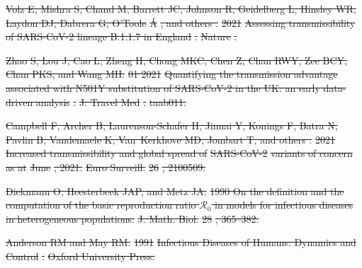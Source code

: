 \documentclass[12pt]{article}
\providecommand{\DIFdeltex}[1]{{\protect\color{red}\sout{#1}}}                      %
\providecommand{\DIFdel}[1]{\texorpdfstring{\DIFdeltex{#1}}{}} %
\begin{document}
\DIFdel{Volz E, Mishra S, Chand M, Barrett JC, Johnson R, Geidelberg L, Hinsley WR,
  Laydon DJ, Dabrera G, O'Toole }%
\DIFdel{\'A}%
\DIFdel{, and others .
}%
\DIFdel{2021 }%
\DIFdel{Assessing transmissibility of SARS-CoV-2 lineage B.1.1.7 in
  England}%
\DIFdel{.
}%
\DIFdel{Nature}%
\DIFdel{.
}%

\DIFdel{Zhao S, Lou J, Cao L, Zheng H, Chong MKC, Chen Z, Chan RWY, Zee BCY, Chan PKS,
  and Wang MH.
}%
\DIFdel{01 2021 }%
\DIFdel{Quantifying the transmission advantage associated with N501Y
  substitution of SARS-CoV-2 in the UK: an early data-driven analysis}%
\DIFdel{.
}%
\DIFdel{J. Travel Med}%
\DIFdel{.
}%
\DIFdel{taab011.
}%

\DIFdel{Campbell F, Archer B, Laurenson-Schafer H, Jinnai Y, Konings F, Batra N, Pavlin
  B, Vandemaele K, Van~Kerkhove MD, Jombart T, and others .
}%
\DIFdel{2021 Increased transmissibility and global spread of }%
\DIFdel{SARS-CoV-2}%
\DIFdel{variants of concern as at }%
\DIFdel{June}%
\DIFdel{, 2021.
}%
\DIFdel{Euro Surveill.}%
\DIFdel{26}%
\DIFdel{, 2100509.
}%

\DIFdel{Diekmann O, Heesterbeek JAP, and Metz JA.
}%
\DIFdel{1990 On the definition and the computation of the basic reproduction
  ratio $\mathcal{R}_0$ in models for infectious diseases in heterogeneous
  populations.
}%
\DIFdel{J. Math. Biol.}%
\DIFdel{28}%
\DIFdel{, 365--382.
}%

\DIFdel{Anderson RM and May RM.
}%
\DIFdel{1991 }%
\DIFdel{Infectious Diseases of Humans: Dynamics and Control}%
\DIFdel{.
}%
\DIFdel{Oxford University Press.
}%
\end{document}

